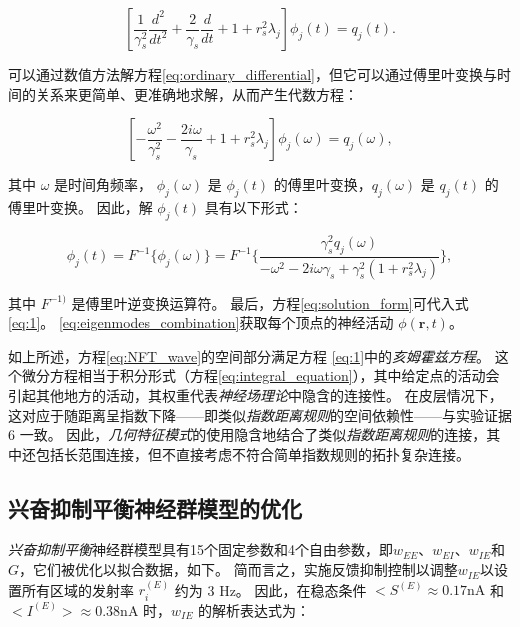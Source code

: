\documentclass[lang=cn,a4paper,newtx,citestyle=gb7714-2015, bibstyle=gb7714-2015]{elegantpaper}
\begin{document}
\begin{equation}\label{eq:ordinary_differential}
	[
		\frac{1}{\gamma _s^2}
		\frac{d^2}{dt^2}
		+
		\frac{2}{\gamma _s}
		\frac{d}{dt}
		+ 1 + r_s^2 \lambda_j
	]
	\phi_j(t) 
	=
	q_j(t).
\end{equation}


可以通过数值方法解方程\ref{eq:ordinary_differential}，但它可以通过傅里叶变换与时间的关系来更简单、更准确地求解，从而产生代数方程：

\begin{equation}\label{eq:algebraic_equation}
	[
		- \frac{\omega ^2}{\gamma_s^2}
		- \frac{2 i \omega}{\gamma_s}
		+ 1
		+ r_s^2 \lambda_j
	]
	\phi_j(\omega)
	=
	q_j(\omega),
\end{equation}

其中 $ ω $ 是时间角频率， $ \phi_j (\omega) $ 是 $ \phi_j (t) $ 的傅里叶变换，$ q_j (\omega) $ 是 $ q_j (t) $ 的傅里叶变换。 因此，解 $ \phi_j (t) $ 具有以下形式：

\begin{equation}\label{eq:solution_form}
	\phi_j(t)
	=
	F^{-1} \{\phi_j(\omega)\}
	=
	F^{-1}
	\{
		\frac{
				\gamma_s^2 q_j(\omega)
			 }
		 	 {
		 	 	- \omega^2
		 	 	- 2 i \omega \gamma_s
		 	 	+ \gamma_s^2
		 	 		(1 + r_s^2 \lambda_j)
		 	 }
	\},
\end{equation}

其中 $ F^{-1)} $ 是傅里叶逆变换运算符。
最后，方程\ref{eq:solution_form}可代入式\ref{eq:1}。
\ref{eq:eigenmodes_combination}获取每个顶点的神经活动 $ \phi(\boldsymbol{r},t) $。



如上所述，方程\ref{eq:NFT_wave}的空间部分满足方程 \ref{eq:1}中的\textit{亥姆霍兹方程}。
这个微分方程相当于积分形式（方程\ref{eq:integral_equation}），其中给定点的活动会引起其他地方的活动，其权重代表\textit{神经场理论}中隐含的连接性。
在皮层情况下，这对应于随距离呈指数下降——即类似\textit{指数距离规则}的空间依赖性——与实验证据 6 一致。
因此，\textit{几何特征模式}的使用隐含地结合了类似\textit{指数距离规则}的连接，其中还包括长范围连接，但不直接考虑不符合简单指数规则的拓扑复杂连接。



\subsection{兴奋抑制平衡神经群模型的优化} \label{sec:mass_optimization}

\textit{兴奋抑制平衡}神经群模型具有15个固定参数和4个自由参数，即$ w_{EE} $、$ w_{EI} $、$ w_{IE} $和 $ G $，它们被优化以拟合数据，如下\cite{rosen2022estimation}。
简而言之，实施反馈抑制控制\cite{van2012high}以调整$ w_{IE} $以设置所有区域的发射率 $ r_i^{(E)} $ 约为 3 Hz。
因此，在稳态条件 $ <S^{(E)} \approx 0.17 \text{nA} $ 和 $ <I^{(E)}> \approx 0.38 \text{nA} $ 时，$ w_{IE} $ 的解析表达式为：
\end{document}
